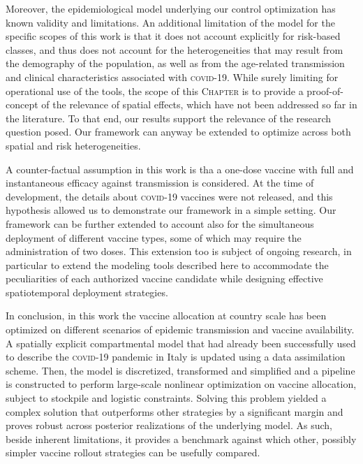 Moreover, the epidemiological model underlying our control optimization has known validity and limitations\cite[-3\baselineskip]{Gatto:SpreadDynamicsCOVID19:2020, Bertuzzo:GeographyCOVID19Spread:2020}. An additional limitation of the model for the specific scopes of this work is that it does not account explicitly for risk-based classes, and thus does not account for the heterogeneities that may result from the demography of the population, as well as from the age-related transmission and clinical characteristics associated with \textsc{covid}-19. While surely limiting for operational use of the tools, the scope of this \textsc{Chapter} is to provide a proof-of-concept of the relevance of spatial effects, which have not been addressed so far in the literature. To that end, our results support the relevance of the research question posed. Our framework can anyway be extended to optimize across both spatial and risk heterogeneities. 

A counter-factual assumption in this work is tha a one-dose vaccine with full and instantaneous efficacy against transmission is considered. At the time of development, the details about \textsc{covid}-19 vaccines were not released, and this hypothesis allowed us to demonstrate our framework in a simple setting. Our framework can be further extended to account also for the simultaneous deployment of different vaccine types, some of which may require the administration of two doses. This extension too is subject of ongoing research, in particular to extend the modeling tools described here to accommodate the peculiarities of each authorized vaccine candidate while designing effective spatiotemporal deployment strategies.

In conclusion, in this work the vaccine allocation at country scale has been optimized on different scenarios of epidemic transmission and vaccine availability. A spatially explicit compartmental model that had already been successfully used to describe the \textsc{covid}-19 pandemic in Italy is updated using a data assimilation scheme. Then, the model is  discretized, transformed and simplified and a pipeline is constructed to perform large-scale nonlinear optimization on vaccine allocation, subject to stockpile and logistic constraints. Solving this problem yielded a complex solution that outperforms other strategies by a significant margin and proves robust across posterior realizations of the underlying model. As such, beside inherent limitations, it provides a benchmark against which other, possibly simpler vaccine rollout strategies can be usefully compared.


